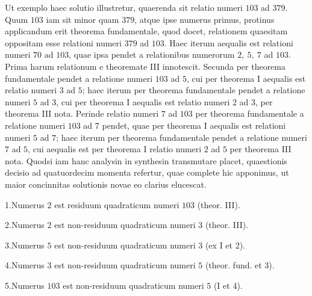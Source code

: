 
Ut exemplo haec solutio illustretur, quaerenda sit relatio numeri $103$ ad $379$. Quum $103$ iam sit minor quam $379$, atque ipse numerus primus, protinus applicandum erit theorema fundamentale, quod docet, relationem quaesitam oppositam esse relationi numeri $379$ ad $103$. Haec iterum aequalis est relationi numeri $70$ ad $103$, quae ipsa pendet a relationibus numerorum $2,\ 5,\ 7$ ad $103$. Prima harum relationum e theoremate III innotescit. Secunda per theorema fundamentale pendet a relatione numeri $103$ ad $5$, cui per theorema I aequalis est relatio numeri $3$ ad $5$; haec iterum per theorema fundamentale pendet a relatione numeri $5$ ad $3$, cui per theorema I aequalis est relatio numeri $2$ ad $3$, per theorema III nota. Perinde relatio numeri $7$ ad $103$ per theorema fundamentale a relatione numeri $103$ ad $7$ pendet, quae per theorema I aequalis est relationi numeri $5$ ad $7$; haec iterum per theorema fundamentale pendet a relatione numeri $7$ ad $5$, cui aequalis est per theorema I relatio numeri $2$ ad $5$ per theorema III nota. Quodsi iam hanc analysin in synthesin transmutare placet, quaestionis decisio ad quatuordecim momenta refertur, quae complete hic apponimus, ut maior concinnitas solutionis novae eo clarius elucescat.

1.\quad Numerus $2$ est residuum quadraticum numeri $103$ (theor. III).

2.\quad Numerus $2$ est non-residuum quadraticum numeri $3$ (theor. III).

3.\quad Numerus $5$ est non-residuum quadraticum numeri $3$ (ex I et 2).

4.\quad Numerus $3$ est non-residuum quadraticum numeri $5$ (theor. fund. et 3).

5.\quad Numerus $103$ est non-residuum quadraticum numeri $5$ (I et 4).

